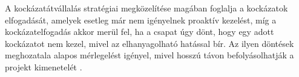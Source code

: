 A kockázatátvállalás stratégiai megközelítése magában foglalja a kockázatok elfogadását, amelyek esetleg már nem igényelnek proaktív kezelést, míg a kockázatelfogadás akkor merül fel, ha a csapat úgy dönt, hogy egy adott kockázatot nem kezel, mivel az elhanyagolható hatással bír. Az ilyen döntések meghozatala alapos mérlegelést igényel, mivel hosszú távon befolyásolhatják a projekt kimenetelét \cite[175]{boehm1989software}.